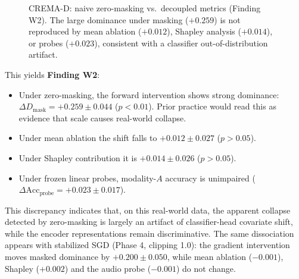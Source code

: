 \documentclass[conference]{IEEEtran}
\begin{document}
\begin{figure}[!t]
\centering
{}
\caption{CREMA-D: naive zero-masking vs.\ decoupled metrics (Finding W2). The large dominance under masking ($+0.259$) is not reproduced by mean ablation ($+0.012$), Shapley analysis ($+0.014$), or probes ($+0.023$), consistent with a classifier out-of-distribution artifact.}
\label{fig:cremad_decoupled}
\end{figure}

This yields \textbf{Finding W2}:
\begin{itemize}
    \item Under zero-masking, the forward intervention shows strong dominance: $\Delta D_{\text{mask}} = +0.259 \pm 0.044$ ($p < 0.01$). Prior practice would read this as evidence that scale causes real-world collapse.
    \item Under mean ablation the shift falls to $+0.012 \pm 0.027$ ($p > 0.05$).
    \item Under Shapley contribution it is $+0.014 \pm 0.026$ ($p > 0.05$).
    \item Under frozen linear probes, modality-$A$ accuracy is unimpaired ($\Delta \text{Acc}_{\text{probe}} = +0.023 \pm 0.017$).
\end{itemize}
This discrepancy indicates that, on this real-world data, the apparent collapse detected by zero-masking is largely an artifact of classifier-head covariate shift, while the encoder representations remain discriminative.
The same dissociation appears with stabilized SGD (Phase 4, clipping 1.0): the gradient intervention moves masked dominance by $+0.200 \pm 0.050$, while mean ablation ($-0.001$), Shapley ($+0.002$) and the audio probe ($-0.001$) do not change.
\end{document}
